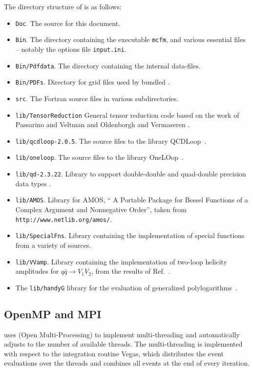 The directory structure of \MCFM{} is as follows:
\begin{itemize}
\item {\tt Doc}. The source for this document.
\item {\tt Bin}. The directory containing the executable {\tt mcfm},
and various essential files -- notably the options file {\tt input.ini}.
\item {\tt Bin/Pdfdata}. The directory containing the internal \PDF{} data-files.
\item {\tt Bin/PDFs}. Directory for \LHAPDF{} grid files used by bundled \LHAPDF{}.
\item {\tt src}. The Fortran source files in various subdirectories.
\item {\tt lib/TensorReduction} General tensor reduction code based on the work of Passarino and 
Veltman \cite{Passarino:1978jh} and Oldenborgh and Vermaseren \cite{vanOldenborgh:1989wn}.
\item {\tt lib/qcdloop-2.0.5}. The source files to the library 
QCDLoop~\cite{Carrazza:2016gav,Ellis:2007qk}.
\item {\tt lib/oneloop}. The source files to the library OneLOop~\cite{vanHameren:2010cp}.
\item {\tt lib/qd-2.3.22}. Library to support double-double and quad-double precision data types \cite{libqd}.
\item {\tt lib/AMOS}. Library for AMOS, `` A Portable Package for Bessel Functions of a Complex Argument
 and Nonnegative Order'', taken from {\tt http://www.netlib.org/amos/}.
\item {\tt lib/SpecialFns}. Library containing the implementation of special
functions from a variety of sources.
\item {\tt lib/VVamp}. Library containing the implementation of two-loop helicity
amplitudes for $q\bar q \to V_1 V_2$, from the results of
Ref.~\cite{Gehrmann:2015ora}.
\item The {\tt lib/handyG} library for the evaluation of generalized
polylogarithms~\cite{Naterop:2019xaf}.
\end{itemize}
 
\subsection{OpenMP and MPI}
\MCFM{} uses \OMP{} (Open Multi-Processing) to implement multi-threading and automatically adjusts to the 
number of available \CPU{} threads. The multi-threading is implemented with respect to the integration routine 
Vegas, which distributes the event evaluations over the threads and combines all events at the end of 
every iteration.

